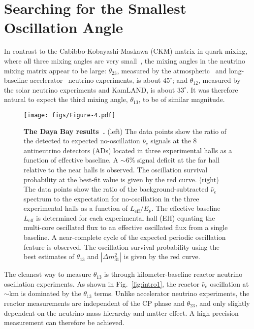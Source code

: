 \documentclass[aps,twocolumn,preprintnumbers,amsmath,superscriptaddress,amssymb,floats,nofootinbib]{revtex4-1}
\begin{document}
\section{Searching for the Smallest Oscillation Angle} 
\label{sec:theta13}
In contrast to the  Cabibbo-Kobayashi-Maskawa (CKM) matrix in quark mixing, where all three mixing angles are very small~\cite{PDG14}, the mixing angles in the neutrino mixing matrix appear to be large: $\theta_{23}$, measured by the atmospheric~\cite{Kajita} and long-baseline accelerator~\cite{Feldman} neutrino experiments, is about $45^\circ$; and $\theta_{12}$, measured by the solar neutrino experiments and KamLAND, is about $33^\circ$. It was therefore natural to expect the third mixing angle, $\theta_{13}$, to be of similar magnitude.

\begin{figure*}[tb] \label{fig:dayabay}
  \centering
  \texttt{[image: figs/Figure-4.pdf]}
  \caption{{\bf The Daya Bay results~\cite{Zhang-Neutrino14}.} (left) The data points show the ratio of the detected to expected no-oscillation $\bar\nu_{e}$ signals at the 8 antineutrino detectors (ADs) located in three experimental halls as a function of effective baseline. A $\sim$6\% signal deficit at the far hall relative to the near halls is observed. The oscillation survival probability at the best-fit value is given by the red curve.
  (right) The data points show the ratio of the background-subtracted $\bar\nu_e$ spectrum to the expectation for no-oscillation in the three experimental halls as a function of $L_{\textrm{eff}}/E_{\nu}$. The effective baseline $L_{\textrm{eff}}$ is determined for each experimental hall (EH) equating the multi-core oscillated flux to an effective oscillated flux from a single baseline. A near-complete cycle of the expected periodic oscillation feature is observed. The oscillation survival probability using the best estimates of $\theta_{13}$ and $|\Delta{m}^2_{31}|$ is given by the red curve.}
\end{figure*}

The cleanest way to measure $\theta_{13}$ is through kilometer-baseline reactor neutrino oscillation experiments. As shown in Fig.~\ref{fig:intro1}, the reactor $\bar\nu_e$ oscillation at $\sim$km is dominated by the $\theta_{13}$ terms. Unlike accelerator neutrino experiments, the reactor measurements are independent of the CP phase and $\theta_{23}$, and only slightly dependent on the neutrino mass hierarchy and matter effect. A high precision measurement can therefore be achieved.
\end{document}
